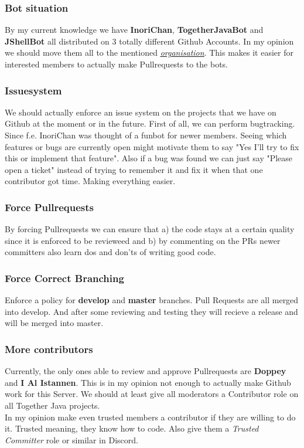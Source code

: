 \documentclass{article}
\begin{document}
    \subsubsection{Bot situation}
    By my current knowledge we have \textbf{InoriChan}, \textbf{TogetherJavaBot} and \textbf{JShellBot} all distributed on 3 totally different Github Accounts.
    In my opinion we should move them all to the mentioned \hyperref[sec:githuborganisation]{\underline{\textit{organisation}}}. 
    This makes it easier for interested members to actually make Pullrequests to the bots.

    \subsubsection{Issuesystem}
    We should actually enforce an issue system on the projects that we have on Github at the moment or in the future. 
    First of all, we can perform bugtracking. Since f.e. InoriChan was thought of a funbot for newer members. Seeing which features or 
    bugs are currently open might motivate them to say "Yes I'll try to fix this or implement that feature". Also if a bug was found we can just say 
    "Please open a ticket" instead of trying to remember it and fix it when that one contributor got time. Making everything easier.

    \subsubsection{Force Pullrequests}
    \label{sec:forcepullrequests}
    By forcing Pullrequests we can ensure that a) the code stays at a certain quality since it is enforced to be revieweed and 
    b) by commenting on the PRs newer committers also learn dos and don'ts of writing good code.

    \subsubsection{Force Correct Branching}
    \label{sec:forcecorrectbranching}
    Enforce a policy for \textbf{develop} and \textbf{master} branches. Pull Requests are all merged into develop. 
    And after some reviewing and testing they will recieve a release and will be merged into master.

    \subsubsection{More contributors}
    Currently, the only ones able to review and approve Pullrequests are \textbf{Doppey} and \textbf{I Al Istannen}. 
    This is in my opinion not enough to actually make Github work for this Server. 
    We should at least give all moderators a Contributor role on all Together Java projects. \\
    In my opinion make even trusted members a contributor if they are willing to do it. 
    Trusted meaning, they know how to code. Also give them a \textit{Trusted Committer} role or similar in Discord.
\end{document}
